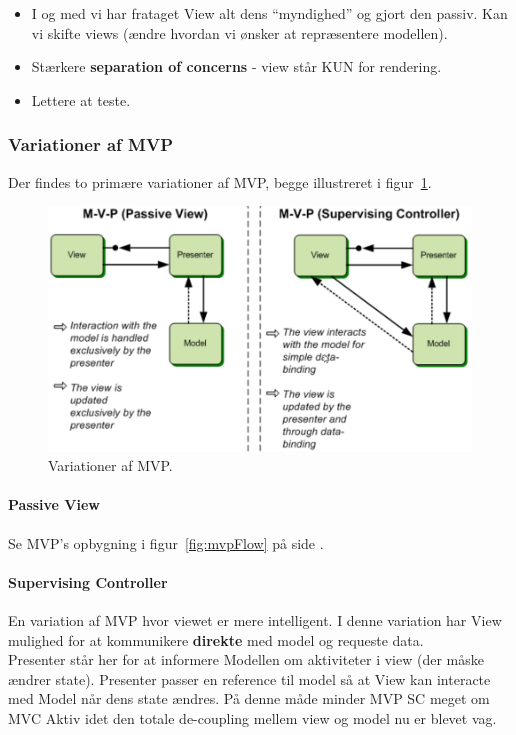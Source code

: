 \begin{itemize}
	\item I og med vi har frataget View alt dens “myndighed” og gjort den passiv. Kan vi skifte views (ændre hvordan vi ønsker at repræsentere modellen).
	\item Stærkere \textbf{separation of concerns} - view står KUN for rendering.
	\item Lettere at teste.
\end{itemize}

\subsubsection{Variationer af MVP}
Der findes to primære variationer af MVP, begge illustreret i figur~\ref{fig:mvp_variations}.

\begin{figure}[h]
\centering
\includegraphics[width=0.9\linewidth]{figs/MVC/mvp_variations}
\caption{Variationer af MVP.}
\label{fig:mvp_variations}
\end{figure}


\paragraph{Passive View}
Se MVP's opbygning i figur~\ref{fig:mvpFlow} på side \pageref{fig:mvpFlow}.

\paragraph{Supervising Controller}
En variation af MVP hvor viewet er mere intelligent. I denne variation har View mulighed for at kommunikere \textbf{direkte} med model og requeste data.\\

Presenter står her for at informere Modellen om aktiviteter i view (der måske ændrer state). Presenter passer en reference til model så at View kan interacte med Model når dens state ændres. På denne måde minder MVP SC meget om MVC Aktiv idet den totale de-coupling mellem view og model nu er blevet vag.\\

